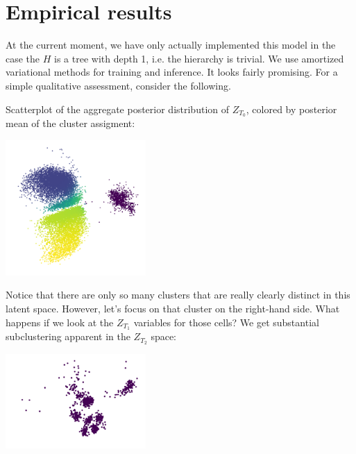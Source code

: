 \section{Empirical results}

At the current moment, we have only actually implemented this model in the case the $H$ is a tree with depth 1, i.e. the hierarchy is trivial.  We use amortized variational methods for training and inference.  It looks fairly promising.  For a simple qualitative assessment, consider the following.

Scatterplot of the aggregate posterior distribution of $Z_{T_0}$, colored by posterior mean of the cluster assigment:

\includegraphics[width=0.4\textwidth]{pics/Z1}

Notice that there are only so many clusters that are really clearly distinct in this latent space.  However, let's focus on that cluster on the right-hand side.  What happens if we look at the $Z_{T_1}$ variables for those cells?  We get substantial subclustering apparent in the $Z_{T_2}$ space:

\includegraphics[width=0.4\textwidth]{pics/Z2}

% 
% 








































